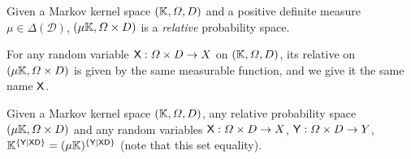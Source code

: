 \begin{definition}


Given a Markov kernel space $(\mathbb{K},\Omega,D)$ and a positive definite measure $\mu\in \Delta(\mathcal{D})$, $(\mu\mathbb{K},\Omega\times D)$ is a \emph{relative} probability space.

For any random variable $\mathsf{X}:\Omega\times D\to X$ on $(\mathbb{K},\Omega,D)$, its relative on $(\mu\mathbb{K},\Omega\times D)$ is given by the same measurable function, and we give it the same name $\mathsf{X}$.
\end{definition}


\begin{theorem}
Given a Markov kernel space $(\mathbb{K},\Omega,D)$, any relative probability space $(\mu\mathbb{K},\Omega\times D)$ and any random variables $\mathsf{X}:\Omega\times D\to X$, $\mathsf{Y}:\Omega\times D\to Y$, $\mathbb{K}^{\{\mathsf{Y}|\mathsf{X}\mathsf{D}\}}=(\mu\mathbb{K})^{\{\mathsf{Y}|\mathsf{X}\mathsf{D}\}}$ (note that this set equality).
\end{theorem}

